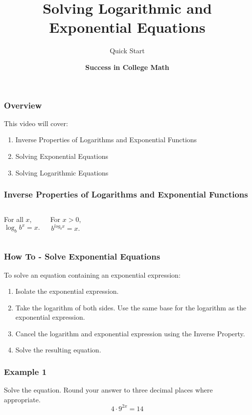 \documentclass[aspectratio=169,17pt]{beamer}
\title{\textbf{Solving Logarithmic and Exponential Equations}}
\subtitle{Quick Start}
\author{\textsf{\textbf{Success in College Math}}}
\date{}
\begin{document}
\begin{frame}
	\titlepage
\end{frame}

\begin{frame}
	\frametitle{Overview}
	\begin{block}{This video will cover:} \pause
	\begin{enumerate}
		\item Inverse Properties of Logarithms and Exponential Functions \pause
		\item Solving Exponential Equations \pause
		\item Solving Logarithmic Equations
	\end{enumerate}
	\end{block}
\end{frame}

\begin{frame}
	\frametitle{Inverse Properties of Logarithms and Exponential Functions}
	\begin{columns}
		
		\begin{block}{}
		For all $x$,
		$$\log_b{b^x} = x.$$
		\end{block}
		
		
		\begin{block}{}
		For $x > 0$,
		$$b^{log_b{x}} = x.$$
		\end{block}
	
	\end{columns}
\end{frame}

\begin{frame}
	\frametitle{How To - Solve Exponential Equations}
	To solve an equation containing an exponential expression: \pause
	\begin{enumerate}
		\item Isolate the exponential expression. \pause
		\item Take the logarithm of both sides. Use the same base for the logarithm as the exponential expression. \pause
		\item Cancel the logarithm and exponential expression using the Inverse Property. \pause
		\item Solve the resulting equation.
	\end{enumerate}
\end{frame}

\begin{frame}[t]
	\frametitle{Example 1}
	Solve the equation. Round your answer to three decimal places where appropriate.
	$$4 \cdot 9^{2x} = 14$$
\end{frame}
\end{document}
